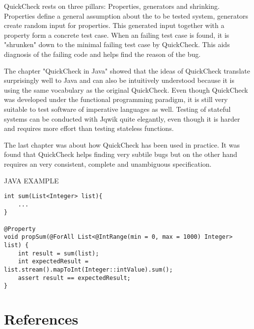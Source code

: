 \documentclass[a4paper, 12pt]{article} %
\begin{document}

QuickCheck rests on three pillars: Properties, generators and shrinking. Properties define a general assumption about the to be tested system, generators create random input for properties. This generated input together with a property form a concrete test case. When an failing test case is found, it is "shrunken" down to the minimal failing test case by QuickCheck. This aids diagnosis of the failing code and helps find the reason of the bug. 


The chapter "QuickCheck in Java" showed that the ideas of QuickCheck translate surprisingly well to Java and can also be intuitively understood because it is using the same vocabulary as the original QuickCheck. Even though QuickCheck was developed under the functional programming paradigm, it is still very suitable to test software of imperative languages as well. Testing of stateful systems can be conducted with Jqwik quite elegantly, even though it is harder and requires more effort than testing stateless functions.


The last chapter was about how QuickCheck has been used in practice. It was found that QuickCheck helps finding very subtile bugs but on the other hand requires an very consistent, complete and unambiguous specification. 


\newpage

JAVA EXAMPLE

\begin{verbatim}
int sum(List<Integer> list){
    ...
}

@Property
void propSum(@ForAll List<@IntRange(min = 0, max = 1000) Integer> list) {
    int result = sum(list);
    int expectedResult = list.stream().mapToInt(Integer::intValue).sum();
    assert result == expectedResult;
}
\end{verbatim}

\section{References}
\printbibliography[heading=none]
\end{document}
